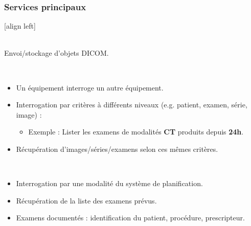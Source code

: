 \frame
{
	\frametitle{Services principaux}
	[align left]
	\begin{description}
		\item<2->[Store]~\\
		Envoi/stockage d'objets DICOM.
		\item<3->[Query/Retrieve]~\\
		\begin{itemize}
			\item<4-> Un \'equipement interroge un autre \'equipement.
			\item<5-> Interrogation par crit\`eres \`a diff\'erents niveaux (e.g. patient, examen, s\'erie, image) :
			\begin{itemize}
				\item<6-> Exemple : Lister les examens de modalit\'es \textbf{CT} produits depuis \textbf{24h}.
			\end{itemize}
			\item<7-> R\'ecup\'eration d'images/s\'eries/examens selon ces m\^emes crit\`eres.
		\end{itemize}
		\item<8->[Modality worklist]~\\
		\begin{itemize}
			\item<9-> Interrogation par une modalit\'e du syst\`eme de planification.
			\item<10-> R\'ecup\'eration de la liste des examens pr\'evus.
			\item<11-> Examens document\'es : identification du patient, proc\'edure, prescripteur.
		\end{itemize}
	\end{description}
}


